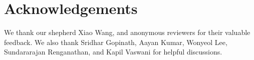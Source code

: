 \section{Acknowledgements}\label{sec:ack}
We thank our shepherd Xiao Wang, and anonymous reviewers for their valuable feedback.
We also thank  Sridhar Gopinath, Aayan Kumar,  Wonyeol Lee,
Sundararajan Renganathan, and Kapil Vaswani for helpful discussions.
